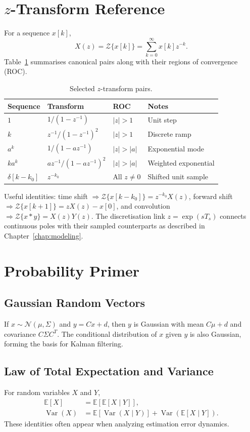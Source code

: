 \section{$z$-Transform Reference}
For a sequence $x[k]$,
\[
    X(z) = \mathcal{Z}\{x[k]\} = \sum_{k=0}^{\infty} x[k] z^{-k}.
\]
Table~\ref{tab:z-pairs} summarises canonical pairs along with their regions of convergence (ROC).
\begin{table}[h]
    \centering
    \begin{tabular}{llll}
        \toprule
        Sequence & Transform & ROC & Notes \\
        \midrule
        $1$ & $1/(1 - z^{-1})$ & $|z| > 1$ & Unit step \\
        $k$ & $z^{-1}/(1 - z^{-1})^2$ & $|z| > 1$ & Discrete ramp \\
        $a^k$ & $1/(1 - a z^{-1})$ & $|z| > |a|$ & Exponential mode \\
        $k a^k$ & $a z^{-1}/(1 - a z^{-1})^2$ & $|z| > |a|$ & Weighted exponential \\
        $\delta[k - k_0]$ & $z^{-k_0}$ & All $z \neq 0$ & Shifted unit sample \\
        \bottomrule
    \end{tabular}
    \caption{Selected $z$-transform pairs.}
    \label{tab:z-pairs}
\end{table}
Useful identities: time shift $\Rightarrow \mathcal{Z}\{x[k - k_0]\} = z^{-k_0} X(z)$, forward shift $\Rightarrow \mathcal{Z}\{x[k+1]\} = z X(z) - x[0]$, and convolution $\Rightarrow \mathcal{Z}\{x * y\} = X(z) Y(z)$. The discretisation link $z = \exp(s T_s)$ connects continuous poles with their sampled counterparts as described in Chapter~\ref{chap:modeling}.

\section{Probability Primer}
\subsection{Gaussian Random Vectors}
If $x \sim \mathcal{N}(\mu, \Sigma)$ and $y = C x + d$, then $y$ is Gaussian with mean $C \mu + d$ and covariance $C \Sigma C^T$. The conditional distribution of $x$ given $y$ is also Gaussian, forming the basis for Kalman filtering.

\subsection{Law of Total Expectation and Variance}
For random variables $X$ and $Y$,
\begin{align}
    \mathbb{E}[X] &= \mathbb{E}[ \mathbb{E}[X \mid Y]], \\
    \operatorname{Var}(X) &= \mathbb{E}[ \operatorname{Var}(X \mid Y)] + \operatorname{Var}( \mathbb{E}[X \mid Y]).
\end{align}
These identities often appear when analyzing estimation error dynamics.

